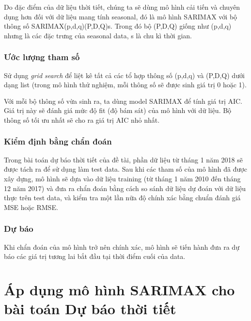\documentclass[12pt]{article}
\begin{document}
        Do đặc điểm của dữ liệu thời tiết, chúng ta sẽ dùng mô hình cải tiến và chuyên dụng hơn đối với dữ liệu mang tính seasonal, đó là mô hình SARIMAX với bộ thông số SARIMAX(p,d,q)(P,D,Q)s. Trong đó bộ (P,D,Q) giống như (p,d,q) nhưng là các đặc trưng của seasonal data, s là chu kì thời gian.
    
        \subsubsection{Ước lượng tham số}
        Sử dụng \emph{grid search} để liệt kê tất cả các tổ hợp thông số (p,d,q) và (P,D,Q) dưới dạng list (trong mô hình thử nghiệm, mỗi thông số sẽ được sinh giá trị 0 hoặc 1).
    
        Với mỗi bộ thông số vừa sinh ra, ta dùng model SARIMAX để tính giá trị AIC. Giá trị này sẽ đánh giá mức độ fit (độ bám sát) của mô hình với dữ liệu. Bộ thông số tối ưu nhất sẽ cho ra giá trị AIC nhỏ nhất.

        \subsubsection{Kiểm định bằng chẩn đoán}
         Trong bài toán dự báo thời tiết của đề tài, phần dữ liệu từ tháng 1 năm 2018 sẽ được tách ra để sử dụng làm test data. Sau khi các tham số của mô hình đã được xây dựng, mô hình sẽ dựa vào dữ liệu training (từ tháng 1 năm 2010 đến tháng 12 năm 2017) và đưa ra chẩn đoán bằng cách so sánh dữ liệu dự đoán với dữ liệu thực trên test data, và kiểm tra một lần nữa độ chính xác bằng chuẩn đánh giá MSE hoặc RMSE.

        \subsubsection{Dự báo}
        Khi chẩn đoán của mô hình trở nên chính xác, mô hình sẽ tiến hành đưa ra dự báo các giá trị tương lai bắt đầu tại thời điểm cuối của data.
    
\section{Áp dụng mô hình SARIMAX cho bài toán Dự báo thời tiết}
\end{document}
